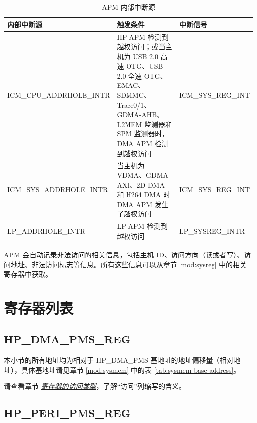 \documentclass[main\_\_CN.tex]{subfiles}
\begin{document}
\begin{longtable}{ | l | L{8cm} | l | }
\caption{APM 内部中断源} \label{tab:apm-int-sources}
\\ \hline
{}
\textbf{内部中断源} & \textbf{触发条件}  &  \textbf{中断信号}\\ \hline
ICM\_CPU\_ADDRHOLE\_INTR &  HP APM 检测到越权访问；或当主机为 USB 2.0 高速 OTG、USB 2.0 全速 OTG、EMAC、SDMMC、Trace0/1、GDMA-AHB、L2MEM 监测器和 SPM 监测器时，DMA APM 检测到越权访问 &  ICM\_SYS\_REG\_INT \\ \hline
ICM\_SYS\_ADDRHOLE\_INTR & 当主机为 VDMA、GDMA-AXI、2D-DMA 和 H264 DMA 时 DMA APM 发生了越权访问 &  ICM\_SYS\_REG\_INT \\ \hline
LP\_ADDRHOLE\_INTR &  LP APM 检测到越权访问 &  LP\_SYSREG\_INTR  \\ \hline
\end{longtable}

APM 会自动记录非法访问的相关信息，包括主机 ID、访问方向（读或者写）、访问地址、非法访问标志等信息。所有这些信息可以从章节 \ref{mod:sysreg} \textit{} 中的相关寄存器中获取。




\clearpage
\hypertarget{permctrl-reg-summ}{}
\section{寄存器列表}
\label{sec:permctrl-reg-summ}

\subsection{HP\_DMA\_PMS\_REG}
\label{sec:permctrl-reg-dma}

本小节的所有地址均为相对于 HP\_DMA\_PMS 基地址的地址偏移量（相对地址），具体基地址请见章节 \ref{mod:sysmem} \textit{} 中的表 \ref{tab:sysmem-base-address}。

请查看章节 \hyperref[glossary-access-types]{\textit{寄存器的访问类型}}，了解“访问”列缩写的含义。


\subsection{HP\_PERI\_PMS\_REG}
\label{sec:permctrl-reg-hp}
\end{document}
